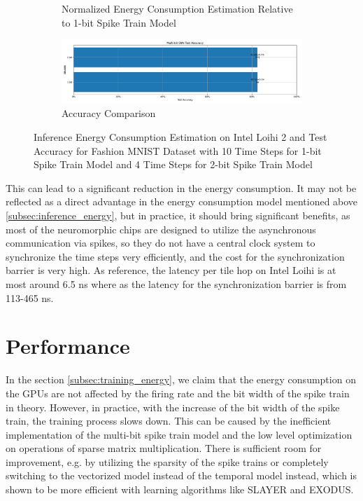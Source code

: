 \begin{figure}[!htpb]
\begin{subfigure}[H]{0.48\textwidth}
                \caption{Normalized Energy Consumption Estimation Relative to 1-bit Spike Train Model}
            \end{subfigure}
            \hfill
            \begin{subfigure}[H]{\textwidth}
                \centering
                \includegraphics[width=\textwidth]{../timesteps/FashionMNIST/plots/fashionmnist_final_acc.pdf}
                \caption{Accuracy Comparison}
            \end{subfigure}
            \caption{Inference Energy Consumption Estimation on Intel Loihi 2 and Test Accuracy for Fashion MNIST Dataset with 10 Time Steps for 1-bit Spike Train Model and 4 Time Steps for 2-bit Spike Train Model}
            \label{fig:inference_energy_nh_timesteps}
        \end{figure}

        This can lead to a significant reduction in the energy consumption. It may not be reflected as a direct advantage in the energy consumption model mentioned above \ref{subsec:inference_energy}, but in practice, it should bring significant benefits, as most of the neuromorphic chips are designed to utilize the asynchronous communication via spikes, so they do not have a central clock system to synchronize the time steps very efficiently, and the cost for the synchronization barrier is very high. As reference, the latency per tile hop on Intel Loihi is at most around 6.5 ns where as the latency for the synchronization barrier is from 113-465 ns.


\section{Performance}
\label{sec:performance}
    In the section \ref{subsec:training_energy}, we claim that the energy consumption on the GPUs are not affected by the firing rate and the bit width of the spike train in theory. However, in practice, with the increase of the bit width of the spike train, the training process slows down. This can be caused by the inefficient implementation of the multi-bit spike train model and the low level optimization on operations of sparse matrix multiplication. 
    There is sufficient room for improvement, e.g. by utilizing the sparsity of the spike trains or completely switching to the vectorized model instead of the temporal model instead, which is shown to be more efficient with learning algorithms like SLAYER and EXODUS. 
